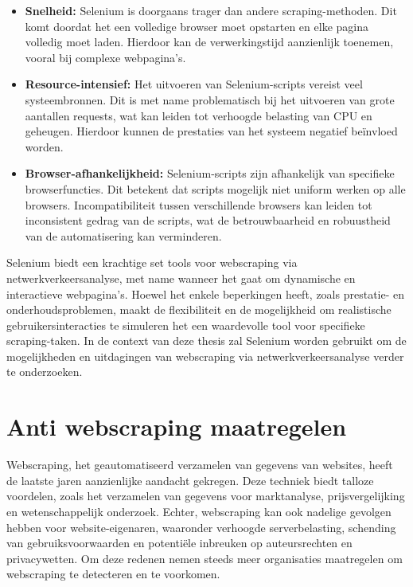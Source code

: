 \begin{itemize}
    \item \textbf{Snelheid:} Selenium is doorgaans trager dan andere scraping-methoden. Dit komt doordat het een volledige browser moet opstarten en elke pagina volledig moet laden. Hierdoor kan de verwerkingstijd aanzienlijk toenemen, vooral bij complexe webpagina's.

    \item \textbf{Resource-intensief:} Het uitvoeren van Selenium-scripts vereist veel systeembronnen. Dit is met name problematisch bij het uitvoeren van grote aantallen requests, wat kan leiden tot verhoogde belasting van CPU en geheugen. Hierdoor kunnen de prestaties van het systeem negatief beïnvloed worden.

    \item \textbf{Browser-afhankelijkheid:} Selenium-scripts zijn afhankelijk van specifieke browserfuncties. Dit betekent dat scripts mogelijk niet uniform werken op alle browsers. Incompatibiliteit tussen verschillende browsers kan leiden tot inconsistent gedrag van de scripts, wat de betrouwbaarheid en robuustheid van de automatisering kan verminderen.
\end{itemize}

Selenium biedt een krachtige set tools voor webscraping via netwerkverkeersanalyse, met name wanneer het gaat om dynamische en interactieve webpagina's. Hoewel het enkele beperkingen heeft, zoals prestatie- en onderhoudsproblemen, maakt de flexibiliteit en de mogelijkheid om realistische gebruikersinteracties te simuleren het een waardevolle tool voor specifieke scraping-taken. In de context van deze thesis zal Selenium worden gebruikt om de mogelijkheden en uitdagingen van webscraping via netwerkverkeersanalyse verder te onderzoeken.

\section{Anti webscraping maatregelen}
Webscraping, het geautomatiseerd verzamelen van gegevens van websites, heeft de laatste jaren aanzienlijke aandacht gekregen. Deze techniek biedt talloze voordelen, zoals het verzamelen van gegevens voor marktanalyse, prijsvergelijking en wetenschappelijk onderzoek. Echter, webscraping kan ook nadelige gevolgen hebben voor website-eigenaren, waaronder verhoogde serverbelasting, schending van gebruiksvoorwaarden en potentiële inbreuken op auteursrechten en privacywetten. Om deze redenen nemen steeds meer organisaties maatregelen om webscraping te detecteren en te voorkomen.

